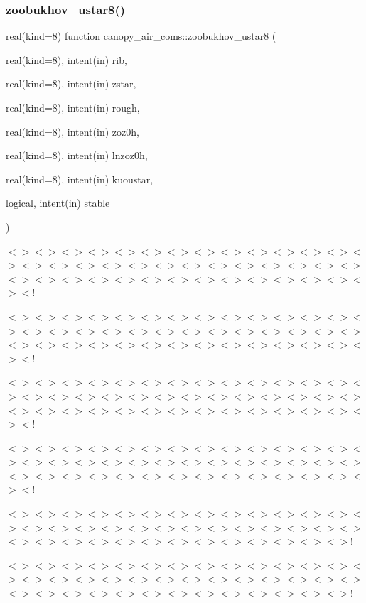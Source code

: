 \subsubsection{\texorpdfstring{zoobukhov\+\_\+ustar8()}{zoobukhov\_ustar8()}}
{\footnotesize\ttfamily real(kind=8) function canopy\+\_\+air\+\_\+coms\+::zoobukhov\+\_\+ustar8 (\begin{DoxyParamCaption}\item[{real(kind=8), intent(in)}]{rib,  }\item[{real(kind=8), intent(in)}]{zstar,  }\item[{real(kind=8), intent(in)}]{rough,  }\item[{real(kind=8), intent(in)}]{zoz0h,  }\item[{real(kind=8), intent(in)}]{lnzoz0h,  }\item[{real(kind=8), intent(in)}]{kuoustar,  }\item[{logical, intent(in)}]{stable }\end{DoxyParamCaption})}

$<$$>$$<$$>$$<$$>$$<$$>$$<$$>$$<$$>$$<$$>$$<$$>$$<$$>$$<$$>$$<$$>$$<$$>$$<$$>$$<$$>$$<$$>$$<$$>$$<$$>$$<$$>$$<$$>$$<$$>$$<$$>$$<$$>$$<$$>$$<$$>$$<$$>$$<$$>$$<$$>$$<$$>$$<$$>$$<$$>$$<$$>$$<$$>$$<$$>$$<$$>$$<$$>$$<$$>$$<$$>$$<$$>$$<$$>$$<$$>$$<$$>$$<$!

$<$$>$$<$$>$$<$$>$$<$$>$$<$$>$$<$$>$$<$$>$$<$$>$$<$$>$$<$$>$$<$$>$$<$$>$$<$$>$$<$$>$$<$$>$$<$$>$$<$$>$$<$$>$$<$$>$$<$$>$$<$$>$$<$$>$$<$$>$$<$$>$$<$$>$$<$$>$$<$$>$$<$$>$$<$$>$$<$$>$$<$$>$$<$$>$$<$$>$$<$$>$$<$$>$$<$$>$$<$$>$$<$$>$$<$$>$$<$$>$$<$$>$$<$!

$<$$>$$<$$>$$<$$>$$<$$>$$<$$>$$<$$>$$<$$>$$<$$>$$<$$>$$<$$>$$<$$>$$<$$>$$<$$>$$<$$>$$<$$>$$<$$>$$<$$>$$<$$>$$<$$>$$<$$>$$<$$>$$<$$>$$<$$>$$<$$>$$<$$>$$<$$>$$<$$>$$<$$>$$<$$>$$<$$>$$<$$>$$<$$>$$<$$>$$<$$>$$<$$>$$<$$>$$<$$>$$<$$>$$<$$>$$<$$>$$<$$>$$<$!

$<$$>$$<$$>$$<$$>$$<$$>$$<$$>$$<$$>$$<$$>$$<$$>$$<$$>$$<$$>$$<$$>$$<$$>$$<$$>$$<$$>$$<$$>$$<$$>$$<$$>$$<$$>$$<$$>$$<$$>$$<$$>$$<$$>$$<$$>$$<$$>$$<$$>$$<$$>$$<$$>$$<$$>$$<$$>$$<$$>$$<$$>$$<$$>$$<$$>$$<$$>$$<$$>$$<$$>$$<$$>$$<$$>$$<$$>$$<$$>$$<$$>$$<$!

$<$$>$$<$$>$$<$$>$$<$$>$$<$$>$$<$$>$$<$$>$$<$$>$$<$$>$$<$$>$$<$$>$$<$$>$$<$$>$$<$$>$$<$$>$$<$$>$$<$$>$$<$$>$$<$$>$$<$$>$$<$$>$$<$$>$$<$$>$$<$$>$$<$$>$$<$$>$$<$$>$$<$$>$$<$$>$$<$$>$$<$$>$$<$$>$$<$$>$$<$$>$$<$$>$$<$$>$$<$$>$$<$$>$$<$$>$$<$$>$!

$<$$>$$<$$>$$<$$>$$<$$>$$<$$>$$<$$>$$<$$>$$<$$>$$<$$>$$<$$>$$<$$>$$<$$>$$<$$>$$<$$>$$<$$>$$<$$>$$<$$>$$<$$>$$<$$>$$<$$>$$<$$>$$<$$>$$<$$>$$<$$>$$<$$>$$<$$>$$<$$>$$<$$>$$<$$>$$<$$>$$<$$>$$<$$>$$<$$>$$<$$>$$<$$>$$<$$>$$<$$>$$<$$>$$<$$>$$<$$>$!

